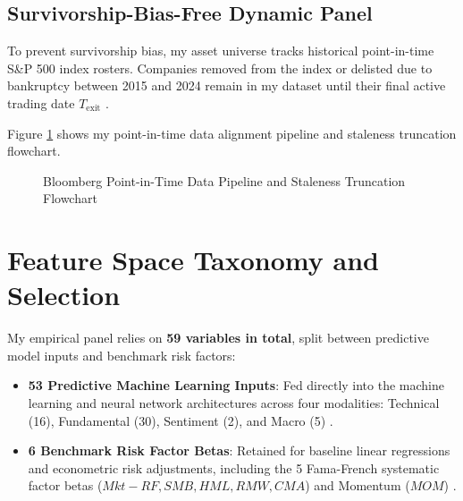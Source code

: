 \subsection{Survivorship-Bias-Free Dynamic Panel}
To prevent survivorship bias, my asset universe tracks historical point-in-time S\&P 500 index rosters. Companies removed from the index or delisted due to bankruptcy between 2015 and 2024 remain in my dataset until their final active trading date $T_{\text{exit}}$ \citep{mclean2016does, hou2020replicating}.

Figure \ref{fig:ch3_pipeline} shows my point-in-time data alignment pipeline and staleness truncation flowchart.

\begin{figure}[htbp]
\centering
{}
\caption{Bloomberg Point-in-Time Data Pipeline and Staleness Truncation Flowchart}
\label{fig:ch3_pipeline}
\end{figure}

\section{Feature Space Taxonomy and Selection}
My empirical panel relies on \textbf{59 variables in total}, split between predictive model inputs and benchmark risk factors:
\begin{itemize}
    \item \textbf{53 Predictive Machine Learning Inputs}: Fed directly into the machine learning and neural network architectures across four modalities: Technical (16), Fundamental (30), Sentiment (2), and Macro (5) \citep{gu2020empirical, cong2021textual}.
    \item \textbf{6 Benchmark Risk Factor Betas}: Retained for baseline linear regressions and econometric risk adjustments, including the 5 Fama-French systematic factor betas ($Mkt-RF, SMB, HML, RMW, CMA$) and Momentum ($MOM$) \citep{fama2015five, carhart1997on}.
\end{itemize}


